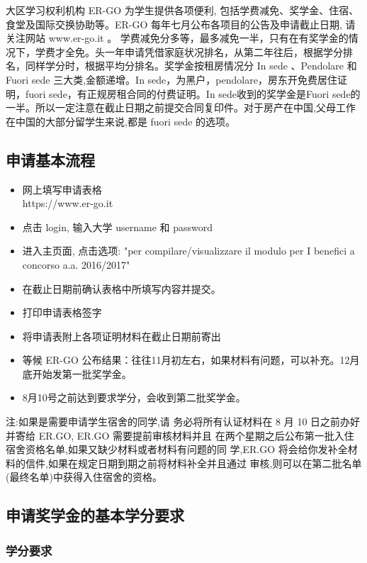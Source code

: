 大区学习权利机构 ER-GO 为学生提供各项便利, 包括学费减免、奖学金、住宿、食堂及国际交换协助等。ER-GO 每年七月公布各项目的公告及申请截止日期, 请关注网站 www.er-go.it 。 
学费减免分多等，最多减免一半，只有在有奖学金的情况下，学费才全免。头一年申请凭借家庭状况排名，从第二年往后，根据学分排名，同样学分时，根据平均分排名。奖学金按租房情况分 In sede 、Pendolare 和 Fuori sede 三大类,金额递增。In sede，为黑户，pendolare，房东开免费居住证明，fuori sede，有正规房租合同的付费证明。In sede收到的奖学金是Fuori sede的一半。所以一定注意在截止日期之前提交合同复印件。对于房产在中国,父母工作在中国的大部分留学生来说,都是 fuori sede 的选项。

\subsection{申请基本流程}
\begin{itemize}
 \item 网上填写申请表格 \\https://www.er-go.it
 \item 点击 login, 输入大学 username 和 password
 \item 进入主页面, 点击选项: "per compilare/visualizzare il modulo per I benefici a concorso a.a.
2016/2017"
 \item 在截止日期前确认表格中所填写内容并提交。
 \item 打印申请表格签字 
 \item 将申请表附上各项证明材料在截止日期前寄出 
 \item 等候 ER-GO 公布结果：往往11月初左右，如果材料有问题，可以补充。12月底开始发第一批奖学金。
 \item 8月10号之前达到要求学分，会收到第二批奖学金。
\end{itemize}
注:如果是需要申请学生宿舍的同学,请
务必将所有认证材料在 8 月 10 日之前办好并寄给 ER.GO, ER.GO 需要提前审核材料并且 在两个星期之后公布第一批入住宿舍资格名单,如果又缺少材料或者材料有问题的同 学,ER.GO 将会给你发补全材料的信件,如果在规定日期到期之前将材料补全并且通过 审核,则可以在第二批名单(最终名单)中获得入住宿舍的资格。

\subsection{申请奖学金的基本学分要求}

\subsubsection{学分要求}

